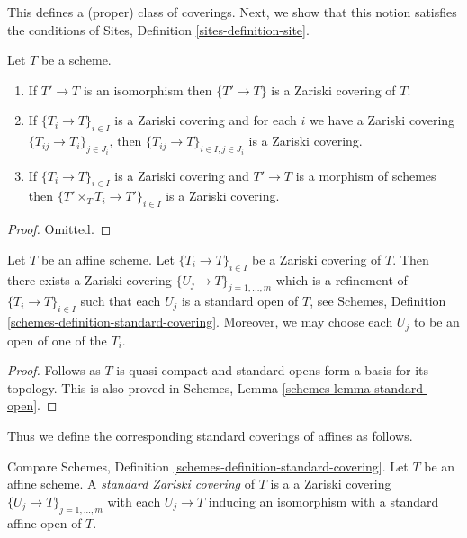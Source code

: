 \noindent
This defines a (proper) class of coverings.
Next, we show that this notion satisfies the conditions of
Sites, Definition \ref{sites-definition-site}.

\begin{lemma}
\label{lemma-zariski}
Let $T$ be a scheme.
\begin{enumerate}
\item If $T' \to T$ is an isomorphism then $\{T' \to T\}$
is a Zariski covering of $T$.
\item If $\{T_i \to T\}_{i\in I}$ is a Zariski covering and for each
$i$ we have a Zariski covering $\{T_{ij} \to T_i\}_{j\in J_i}$, then
$\{T_{ij} \to T\}_{i \in I, j\in J_i}$ is a Zariski covering.
\item If $\{T_i \to T\}_{i\in I}$ is a Zariski covering
and $T' \to T$ is a morphism of schemes then
$\{T' \times_T T_i \to T'\}_{i\in I}$ is a Zariski covering.
\end{enumerate}
\end{lemma}

\begin{proof}
Omitted.
\end{proof}

\begin{lemma}
\label{lemma-zariski-affine}
Let $T$ be an affine scheme. Let $\{T_i \to T\}_{i \in I}$ be a
Zariski covering of $T$. Then there exists a Zariski covering
$\{U_j \to T\}_{j = 1, \ldots, m}$ which is a refinement
of $\{T_i \to T\}_{i \in I}$ such that each $U_j$ is a standard
open of $T$, see
Schemes, Definition \ref{schemes-definition-standard-covering}.
Moreover, we may choose each $U_j$ to be an open of one of the $T_i$.
\end{lemma}

\begin{proof}
Follows as $T$ is quasi-compact and standard opens form a basis
for its topology. This is also proved in
Schemes, Lemma \ref{schemes-lemma-standard-open}.
\end{proof}

\noindent
Thus we define the corresponding standard coverings of affines as follows.

\begin{definition}
\label{definition-standard-Zariski}
Compare Schemes, Definition \ref{schemes-definition-standard-covering}.
Let $T$ be an affine scheme. A {\it standard Zariski covering}
of $T$ is a a Zariski covering $\{U_j \to T\}_{j = 1, \ldots, m}$
with each $U_j \to T$ inducing an isomorphism with a standard affine open
of $T$.
\end{definition}

